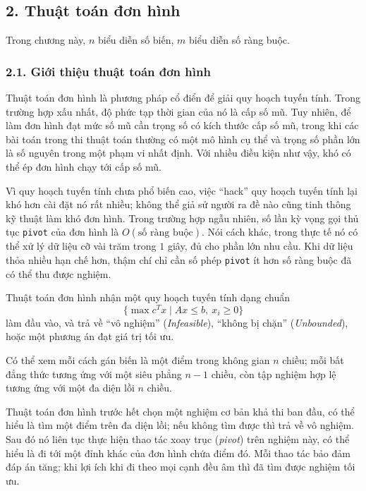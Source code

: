 \documentclass[11pt]{article}
\begin{document}
\subsection*{2. Thuật toán đơn hình}

Trong chương này, \(n\) biểu diễn số biến, \(m\) biểu diễn số ràng buộc.

\subsubsection*{2.1. Giới thiệu thuật toán đơn hình}

Thuật toán đơn hình là phương pháp cổ điển để giải quy hoạch tuyến tính. Trong
trường hợp xấu nhất, độ phức tạp thời gian của nó là cấp số mũ. Tuy nhiên, để
làm đơn hình đạt mức số mũ cần trọng số có kích thước cấp số mũ, trong khi các
bài toán trong thi thuật toán thường có một mô hình cụ thể và trọng số phần
lớn là số nguyên trong một phạm vi nhất định. Với nhiều điều kiện như vậy,
khó có thể ép đơn hình chạy tới cấp số mũ.

Vì quy hoạch tuyến tính chưa phổ biến cao, việc ``hack'' quy hoạch tuyến tính
lại khó hơn cài đặt nó rất nhiều; không thể giả sử người ra đề nào cũng tinh
thông kỹ thuật làm khó đơn hình. Trong trường hợp ngẫu nhiên, số lần kỳ vọng
gọi thủ tục \texttt{pivot} của đơn hình là \(O(\text{số ràng buộc})\). Nói
cách khác, trong thực tế nó có thể xử lý dữ liệu cỡ vài trăm trong \(1\) giây,
đủ cho phần lớn nhu cầu. Khi dữ liệu thỏa nhiều hạn chế hơn, thậm chí chỉ cần
số phép \texttt{pivot} ít hơn số ràng buộc đã có thể thu được nghiệm.

Thuật toán đơn hình nhận một quy hoạch tuyến tính dạng chuẩn
\[
  \{\max c^Tx\mid Ax\le b,\ x_i\ge 0\}
\]
làm đầu vào, và trả về ``vô nghiệm'' (\emph{Infeasible}), ``không bị chặn''
(\emph{Unbounded}), hoặc một phương án đạt giá trị tối ưu.

Có thể xem mỗi cách gán biến là một điểm trong không gian \(n\) chiều; mỗi bất
đẳng thức tương ứng với một siêu phẳng \(n-1\) chiều, còn tập nghiệm hợp lệ
tương ứng với một đa diện lồi \(n\) chiều.

Thuật toán đơn hình trước hết chọn một nghiệm cơ bản khả thi ban đầu, có thể
hiểu là tìm một điểm trên đa diện lồi; nếu không tìm được thì trả về vô
nghiệm. Sau đó nó liên tục thực hiện thao tác xoay trục (\emph{pivot}) trên
nghiệm này, có thể hiểu là đi tới một đỉnh khác của đơn hình chứa điểm đó.
Mỗi thao tác bảo đảm đáp án tăng; khi lợi ích khi đi theo mọi cạnh đều âm thì
đã tìm được nghiệm tối ưu.
\end{document}
